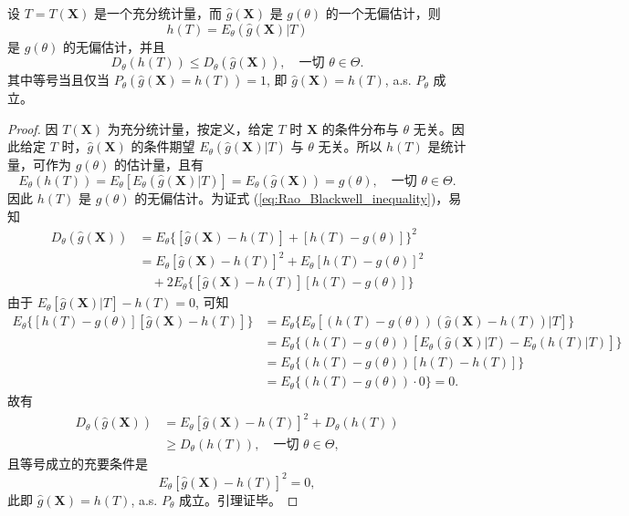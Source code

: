 \begin{lemma}[改进无偏估计的方法]\label{lem:3.4.1_RaoBlackwell}
    设 $T=T(\mathbf{X})$ 是一个充分统计量，而 $\hat{g}(\mathbf{X})$ 是 $g(\theta)$ 的一个无偏估计，则
$$h(T) = E_\theta(\hat{g}(\mathbf{X})|T)$$
是 $g(\theta)$ 的无偏估计，并且
\begin{equation}
D_\theta(h(T)) \leq D_\theta(\hat{g}(\mathbf{X})), \quad \text{一切 } \theta \in \Theta. \label{eq:Rao_Blackwell_inequality}
\end{equation}
其中等号当且仅当 $P_\theta(\hat{g}(\mathbf{X}) = h(T)) = 1$, 即 $\hat{g}(\mathbf{X}) = h(T)$, a.s. $P_\theta$ 成立。
\end{lemma}
\begin{proof}
    因 $T(\mathbf{X})$ 为充分统计量，按定义，给定 $T$ 时 $\mathbf{X}$ 的条件分布与 $\theta$ 无关。因此给定 $T$ 时，$\hat{g}(\mathbf{X})$ 的条件期望 $E_\theta(\hat{g}(\mathbf{X})|T)$ 与 $\theta$ 无关。所以 $h(T)$ 是统计量，可作为 $g(\theta)$ 的估计量，且有
\begin{equation}
E_\theta(h(T)) = E_\theta[E_\theta(\hat{g}(\mathbf{X})|T)] = E_\theta(\hat{g}(\mathbf{X})) = g(\theta), \quad \text{一切 } \theta \in \Theta. \label{eq:h_T_unbiased}
\end{equation}
因此 $h(T)$ 是 $g(\theta)$ 的无偏估计。为证式 (\ref{eq:Rao_Blackwell_inequality})，易知
\begin{align*}
D_\theta(\hat{g}(\mathbf{X})) &= E_\theta\{[\hat{g}(\mathbf{X}) - h(T)] + [h(T) - g(\theta)]\}^2 \\
&= E_\theta[\hat{g}(\mathbf{X}) - h(T)]^2 + E_\theta[h(T) - g(\theta)]^2 \\
&\quad + 2E_\theta\{[\hat{g}(\mathbf{X}) - h(T)][h(T) - g(\theta)]\}
\end{align*}
由于 $E_\theta[\hat{g}(\mathbf{X})|T] - h(T) = 0$, 可知
\begin{align*}
E_\theta\{[h(T) - g(\theta)] [\hat{g}(\mathbf{X}) - h(T)]\} &= E_\theta\{ E_\theta[(h(T) - g(\theta)) (\hat{g}(\mathbf{X}) - h(T))|T] \} \\
&= E_\theta\{ (h(T) - g(\theta)) [E_\theta(\hat{g}(\mathbf{X})|T) - E_\theta(h(T)|T)] \} \\
&= E_\theta\{ (h(T) - g(\theta)) [h(T) - h(T)] \} \\
&= E_\theta\{ (h(T) - g(\theta)) \cdot 0 \} = 0.
\end{align*}
故有
\begin{align*}
D_\theta(\hat{g}(\mathbf{X})) &= E_\theta[\hat{g}(\mathbf{X}) - h(T)]^2 + D_\theta(h(T)) \\
&\ge D_\theta(h(T)), \quad \text{一切 } \theta \in \Theta,
\end{align*}
且等号成立的充要条件是
$$E_\theta[\hat{g}(\mathbf{X}) - h(T)]^2 = 0,$$
此即 $\hat{g}(\mathbf{X}) = h(T)$, a.s. $P_\theta$ 成立。引理证毕。
\end{proof}
